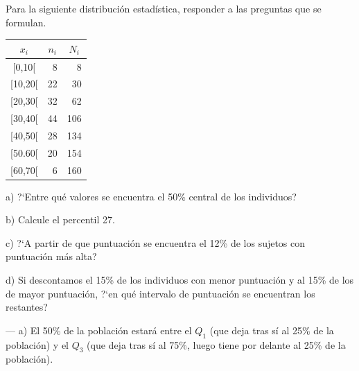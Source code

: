 \vspace{15mm}%
\begin{ejemplo}
\begin{ejre}
Para la siguiente distribución estadística, responder a las  preguntas que se formulan.

\vspace{5mm}%
\begin{multicols}{2}
\begin{table}[H]
\begin{tabular}{c|r|r}
\textbf{$x_i$} & \multicolumn{1}{c|}{\textbf{$n_i$}} & \multicolumn{1}{c}{\textbf{$N_i$}} \\ \hline
{[}0,10{[}     & 8                                   & 8                                  \\
{[}10,20{[}    & 22                                  & 30                                 \\
{[}20,30{[}    & 32                                  & 62                                 \\
{[}30,40{[}    & 44                                  & 106                                \\
{[}40,50{[}    & 28                                  & 134                                \\
{[}50.60{[}    & 20                                  & 154                                \\
{[}60,70{[}    & 6                                   & 160                               
\end{tabular}
\end{table}


\begin{small}
a) ?`Entre qué valores se encuentra el 50\% central de los individuos?

b) Calcule el percentil 27.

c) ?`A partir de que puntuación se encuentra el 12\% de los sujetos con puntuación más alta?

d) Si descontamos el 15\% de los individuos con menor puntuación y al 15\% de los de mayor puntuación, ?`en qué intervalo de puntuación se encuentran los restantes?
\end{small}
\end{multicols}

--- a) El 50\% de la población estará entre el $Q_1$ (que deja tras sí al 25\% de la población) y el $Q_3$ (que deja tras sí al 75\%, luego tiene por delante al 25\% de la población).


\end{ejre}
\end{ejemplo}
